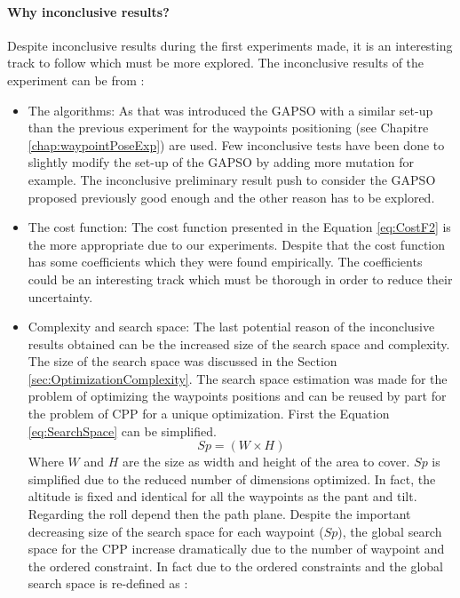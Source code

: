 	\paragraph*{Why inconclusive results?}
			  
		
		Despite inconclusive results during the first experiments made, it is an interesting track to follow  which must  be more explored.  
		The inconclusive results of the experiment can be from : %
		\begin{itemize}
		\item The algorithms: As that was introduced the GAPSO  with a similar set-up than the previous experiment for the waypoints positioning (see Chapitre \ref{chap:waypointPoseExp}) are used. Few inconclusive tests have been done to slightly modify the set-up of the GAPSO by adding more mutation for example. The inconclusive preliminary result push to consider the GAPSO proposed previously good enough and the other reason has to be explored.
		\item The cost function: The cost function presented in the Equation \ref{eq:CostF2} is the more appropriate due to our experiments. Despite that the cost function has some coefficients which they were found empirically. The coefficients could be an interesting track which must be thorough in order to reduce their uncertainty.
		\item Complexity and search space: 
		The last potential reason of the inconclusive results obtained can be the increased size of the search space and complexity. The size of the search space was discussed in the Section \ref{sec:OptimizationComplexity}. The search space estimation was made for the problem of optimizing the waypoints positions and can be reused by part for the problem of CPP for a unique optimization. First the Equation \ref{eq:SearchSpace} can be simplified.  
		\begin{equation} \label{eq:SearchSpaceCPP}
		 Sp=(W\times H)  
		\end{equation}
		Where $W$ and $H$ are the size as width and height of the area to cover. $Sp$  is simplified due to the reduced number of dimensions optimized. In fact, the altitude is fixed and identical for all the waypoints as the pant and tilt. Regarding the roll depend then the path plane.
		Despite the important decreasing size of the search space for each waypoint ($Sp$), the global search space for the CPP increase dramatically  due to the number of waypoint and the ordered constraint. In fact due to the ordered constraints and the global search space is re-defined as :

\end{itemize}
